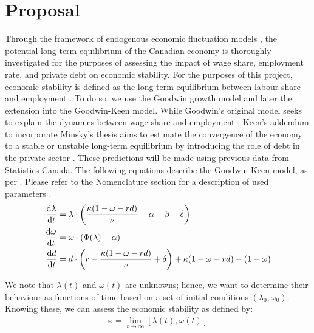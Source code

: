 \documentclass[12pt, centerh1]{article}
\begin{document}
\section{Proposal} \label{s:proposal}
Through the framework of endogenous economic fluctuation models \citep{boldrin1990equilibrium}, the potential long-term equilibrium of the Canadian economy is thoroughly investigated for the purposes of assessing the impact of wage share, employment rate, and private debt on economic stability. For the purposes of this project, economic stability is defined as the long-term equilibrium between labour share and employment \citep{weitzman1983some}. To do so, we use the Goodwin growth model and later the extension into the Goodwin-Keen model. While Goodwin’s original model seeks to explain the dynamics between wage share and employment \citep{goodwin1982growth}, Keen’s addendum to incorporate Minsky’s thesis aims to estimate the convergence of the economy to a stable or unstable long-term equilibrium by introducing the role of debt in the private sector \citep{keen1995finance}. These predictions will be made using previous data from Statistics Canada. The following equations describe the Goodwin-Keen model, as per \citet{grasselli2012analysis}. Please refer to the Nomenclature section for a description of used parameters \citep{grasselli2012analysis,maheshwari2015empirical}.
\begin{align*} 
\centering
    \dv{\lambda}{t} &= \lambda \cdot \left( \frac{\kappa(1-\omega-rd)}{\nu} - \alpha - \beta - \delta \right)\\ 
    \dv{\omega}{t} &= \omega \cdot (\Phi(\lambda) - \alpha)\\
    \dv{d}{t} &= d\cdot\left(r-\frac{\kappa(1-\omega-rd)}{\nu}+\delta\right)+\kappa(1-\omega-rd)-(1-\omega) 
\end{align*}

\noindent We note that $\lambda(t)$ and $\omega(t)$ are unknowns; hence, we want to determine their behaviour as functions of time based on a set of initial conditions $(\lambda_0,\omega_0)$. Knowing these, we can assess the economic stability as defined by:
\begin{equation*}
    \begin{split}
        \bm{\varepsilon}=\lim_{t\to\infty}[\lambda(t), \omega(t)]
    \end{split}
\end{equation*}
\end{document}
